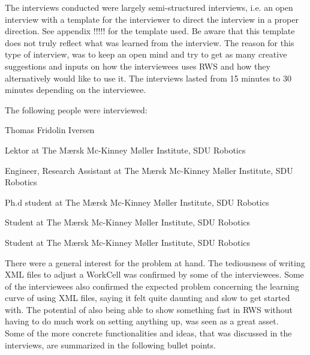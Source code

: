 The interviews conducted were largely semi-structured interviews, i.e. an open interview with a template for the interviewer to direct the interview in a proper direction. See appendix !!!!! for the template used. Be aware that this template does not truly reflect what was learned from the interview. The reason for this type of interview, was to keep an open mind and try to get as many creative suggestions and inputs on how the interviewees uses RWS and how they alternatively would like to use it. The interviews lasted from 15 minutes to 30 minutes depending on the interviewee.

The following people were interviewed:

\begin{labeling}{Thomas Fridolin Iversen}
\item [Lars-Peter Ellekilde] Lektor at The Mærsk Mc-Kinney Møller Institute, SDU Robotics
\item [Thomas Nicky Thuelsen] Engineer, Research Assistant at The Mærsk Mc-Kinney Møller Institute, SDU Robotics
\item [Thomas Fridolin Iversen] Ph.d student at The Mærsk Mc-Kinney Møller Institute, SDU Robotics
\item [Michael Kjær Schmidt] Student at The Mærsk Mc-Kinney Møller Institute, SDU Robotics
\item [Kristian Møller Hansen] Student at The Mærsk Mc-Kinney Møller Institute, SDU Robotics
\end{labeling}

There were a general interest for the problem at hand. The tediousness of writing XML files to adjust a WorkCell was confirmed by some of the interviewees. Some of the interviewees also confirmed the expected problem concerning the learning curve of using XML files, saying it felt quite daunting and slow to get started with. The potential of also being able to show something fast in RWS without having to do much work on setting anything up, was seen as a great asset.\\
Some of the more concrete functionalities and ideas, that was discussed in the interviews, are summarized in the following bullet points.

